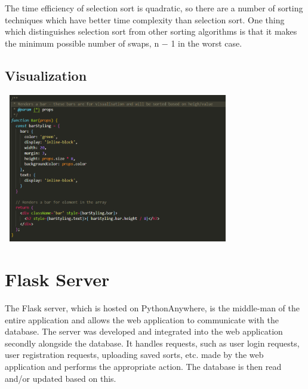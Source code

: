 The time efficiency of selection sort is quadratic, so there are a number of sorting techniques which have better time complexity than selection sort. One thing which distinguishes selection sort from other sorting algorithms is that it makes the minimum possible number of swaps, n − 1 in the worst case.

\subsection{Visualization}
\begin{center}
    \includegraphics[height=6.5cm,width=10cm]{images/bar}
    \label{fig:main_page}
\end{center}

\section{Flask Server}
The Flask server, which is hosted on PythonAnywhere, is the middle-man of the entire application and allows the web application to communicate with the database. The server was developed and integrated into the web application secondly alongside the database. It handles requests, such as user login requests, user registration requests, uploading saved sorts, etc. made by the web application and performs the appropriate action. The database is then read and/or updated based on this. 

